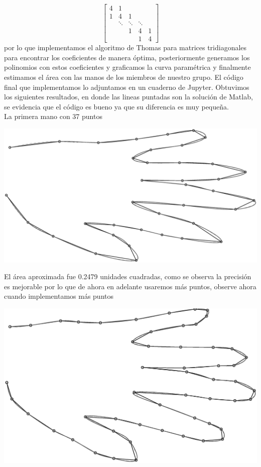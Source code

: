 \begin{solution}
$$\left[\begin{array}{ccccc}
4 & 1 & & & \\
1 & 4 & 1 & & \\
& \ddots & \ddots & \ddots & \\
& & 1 & 4 & 1 \\
& & & 1 & 4
\end{array}\right]$$
por lo que implementamos el algoritmo de Thomas para matrices tridiagonales para encontrar los coeficientes de manera óptima, posteriormente generamos los polinomios con estos coeficientes y graficamos la curva  paramétrica y finalmente estimamos el área con las manos de los miembros de nuestro grupo. El código final que implementamos lo adjuntamos en un cuaderno de Jupyter. Obtuvimos los siguientes resultados, en donde las lineas puntadas son la solución de Matlab, se evidencia que el código es bueno ya que su diferencia es muy pequeña.\\

La primera mano con 37 puntos
\begin{center}
    \includegraphics[scale=0.25]{Graficas/Mano1.eps}
\end{center}
El área aproximada fue 0.2479 unidades cuadradas, como se observa la precisión es mejorable por lo que de ahora en adelante usaremos más puntos, observe ahora cuando implementamos más puntos

\begin{center}
    \includegraphics[scale=0.25]{Graficas/Mano1++.eps}
\end{center}


\end{solution}
